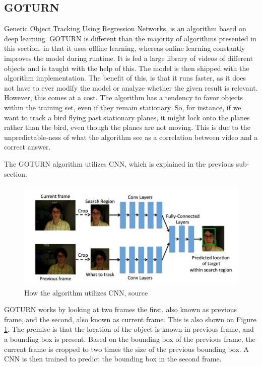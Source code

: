 \subsection{GOTURN}
Generic Object Tracking Using Regression Networks, is an algorithm based on deep learning.\cite{goturn}
GOTURN is different than the majority of algorithms presented in this section, in that it uses offline learning, whereas online learning constantly improves the model during runtime.
It is fed a large library of videos of different objects and is taught with the help of this.
The model is then shipped with the algorithm implementation.
The benefit of this, is that it runs faster, as it does not have to ever modify the model or analyze whether the given result is relevant.
However, this comes at a cost. 
The algorithm has a tendency to favor objects within the training set, even if they remain stationary.
So, for instance, if we want to track a bird flying past stationary planes, it might lock onto the planes rather than the bird, even though the planes are not moving.
This is due to the unpredictable-ness of what the algorithm see as a correlation between video and a correct answer.


The GOTURN algorithm utilizes CNN, which is explained in the previous sub-section.
\begin{figure}[H]
	\centering
	\includegraphics[scale=0.80]{images/GOTURN-architecture.jpg}
	\caption{
		How the algorithm utilizes CNN, source \cite{goturn}
	}
	\label{fig:goturn-arch}
\end{figure}
GOTURN works by looking at two frames the first, also known as previous frame, and the second, also known as current frame.
This is also shown on Figure \ref{fig:goturn-arch}.
The premise is that the location of the object is known in previous frame, and a bounding box is present.
Based on the bounding box of the previous frame, the current frame is cropped to two times the size of the previous bounding box.
A CNN is then trained to predict the bounding box in the second frame.


